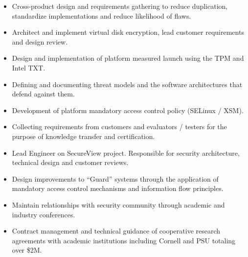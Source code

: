 \documentclass[letterpaper,11pt]{article}
\begin{document}
    \begin {itemize}
        \setlength {\itemsep}{1pt}
        \setlength {\parskip}{0pt}
        \setlength {\parsep}{0pt}
      \item Cross-product design and requirements gathering to reduce duplication, standardize implementations and reduce likelihood of flaws.
      \item Architect and implement virtual disk encryption, lead customer requirements and design review.
    \end {itemize}
    \begin {itemize}
        \setlength {\itemsep}{1pt}
        \setlength {\parskip}{0pt}
        \setlength {\parsep}{0pt}
      \item Design and implementation of platform measured launch using the TPM and Intel\textsuperscript{\textregistered} TXT.
      \item Defining and documenting threat models and the software architectures that defend against them.
      \item Development of platform mandatory access control policy (SELinux / XSM).
      \item Collecting requirements from customers and evaluators / testers for the purpose of knowledge transfer and certification.
    \end {itemize}
      \begin {itemize}
        \setlength {\itemsep}{1pt}
        \setlength {\parskip}{0pt}
        \setlength {\parsep}{0pt}
      \item Lead Engineer on SecureView project. Responsible for security architecture, technical design and customer reviews.
      \item Design improvements to ``Guard'' systems through the application of mandatory access control mechanisms and information flow principles.
      \item Maintain relationships with security community through academic and industry conferences.
      \item Contract management and technical guidance of cooperative research agreements with academic institutions including Cornell and PSU totaling over \$2M.
      \end {itemize}
\end{document}
